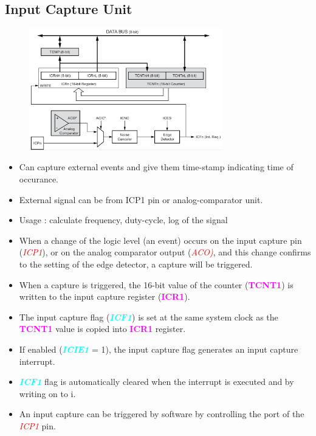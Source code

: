 \documentclass{article}
\newcommand{\bitFormat}[1]{\emph{\textbf{\textcolor{cyan}{#1}}}}
\newcommand{\regFormat}[1]{\textbf{\textcolor{magenta}{#1}}}
\newcommand{\pinFormat}[1]{\emph{\textcolor{red}{#1}}}
\begin{document}
\subsection{Input Capture Unit}
\begin{figure}[H]
    \centering
    \includegraphics[width=0.75\textwidth]{Timer1InputCapture.png}
\end{figure}
\begin{itemize}
    \item Can capture external events and give them time-stamp indicating time of occurance.
    \item External signal can be from ICP1 pin or analog-comparator unit.
    \item Usage : calculate frequency, duty-cycle, log of the signal
    \item When a change of the logic level (an event) occurs on the input capture pin (\pinFormat{ICP1}), or on the analog comparator output (\pinFormat{ACO)}, and this change confirms to the setting of the edge detector, a capture will be triggered. 
    \item When a capture is triggered, the 16-bit value of the counter (\regFormat{TCNT1}) is written to the input capture register (\regFormat{ICR1}).
    \item The input capture flag (\bitFormat{ICF1}) is set at the same system clock as the \regFormat{TCNT1} value is copied into \regFormat{ICR1} register. 
    \item If enabled (\bitFormat{ICIE1} = 1), the input capture flag generates an input capture interrupt.
    \item \bitFormat{ICF1} flag is automatically cleared when the interrupt is executed and by writing on to i.
    \item An input capture can be triggered by software by controlling the port of the \pinFormat{ICP1} pin.
\end{itemize}
\end{document}
